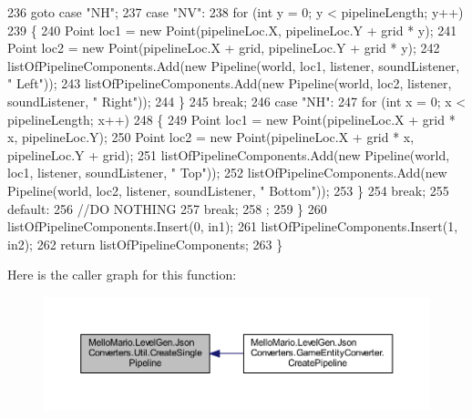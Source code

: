\begin{DoxyCode}
236                     \textcolor{keywordflow}{goto} \textcolor{keywordflow}{case} \textcolor{stringliteral}{"NH"};
237                 \textcolor{keywordflow}{case} \textcolor{stringliteral}{"NV"}:
238                     \textcolor{keywordflow}{for} (\textcolor{keywordtype}{int} y = 0; y < pipelineLength; y++)
239                     \{
240                         Point loc1 = \textcolor{keyword}{new} Point(pipelineLoc.X, pipelineLoc.Y + grid * y);
241                         Point loc2 = \textcolor{keyword}{new} Point(pipelineLoc.X + grid, pipelineLoc.Y + grid * y);
242                         listOfPipelineComponents.Add(\textcolor{keyword}{new} Pipeline(world, loc1, listener, soundListener, \textcolor{stringliteral}{"
      Left"}));
243                         listOfPipelineComponents.Add(\textcolor{keyword}{new} Pipeline(world, loc2, listener, soundListener, \textcolor{stringliteral}{"
      Right"}));
244                     \}
245                     \textcolor{keywordflow}{break};
246                 \textcolor{keywordflow}{case} \textcolor{stringliteral}{"NH"}:
247                     \textcolor{keywordflow}{for} (\textcolor{keywordtype}{int} x = 0; x < pipelineLength; x++)
248                     \{
249                         Point loc1 = \textcolor{keyword}{new} Point(pipelineLoc.X + grid * x, pipelineLoc.Y);
250                         Point loc2 = \textcolor{keyword}{new} Point(pipelineLoc.X + grid * x, pipelineLoc.Y + grid);
251                         listOfPipelineComponents.Add(\textcolor{keyword}{new} Pipeline(world, loc1, listener, soundListener, \textcolor{stringliteral}{"
      Top"}));
252                         listOfPipelineComponents.Add(\textcolor{keyword}{new} Pipeline(world, loc2, listener, soundListener, \textcolor{stringliteral}{"
      Bottom"}));
253                     \}
254                     \textcolor{keywordflow}{break};
255                 \textcolor{keywordflow}{default}:
256                     \textcolor{comment}{//DO NOTHING}
257                     \textcolor{keywordflow}{break};
258                     ;
259             \}
260             listOfPipelineComponents.Insert(0, in1);
261             listOfPipelineComponents.Insert(1, in2);
262             \textcolor{keywordflow}{return} listOfPipelineComponents;
263         \}
\end{DoxyCode}
Here is the caller graph for this function\+:
\nopagebreak
\begin{figure}[H]
\begin{center}
\leavevmode
\includegraphics[width=350pt]{classMelloMario_1_1LevelGen_1_1JsonConverters_1_1Util_adaad228e6d75b4457e8073b722af6ed0_icgraph}
\end{center}
\end{figure}
